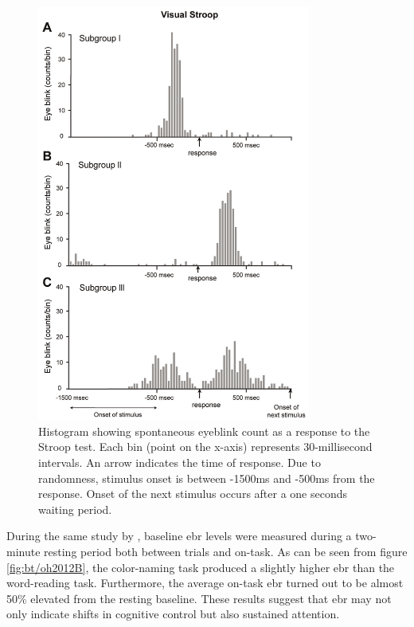 \begin{figure}[h!]
    \centering
    \includegraphics[width=0.8\textwidth]{figures/bt_oh2012A.png}
    \caption{Histogram showing spontaneous eyeblink count as a response to the Stroop test. Each bin (point on the x-axis) represents 30-millisecond intervals. An arrow indicates the time of response. Due to randomness, stimulus onset is between -1500ms and -500ms from the response. Onset of the next stimulus occurs after a one seconds waiting period.}
    \label{fig:bt/oh2012A}
\end{figure}

During the same study by \textcite{oh2012}, baseline \acrshort{ebr} levels were measured during a two-minute resting period both between trials and on-task. As can be seen from figure \ref{fig:bt/oh2012B}, the color-naming task produced a slightly higher \acrshort{ebr} than the word-reading task. Furthermore, the average on-task \acrshort{ebr} turned out to be almost 50\% elevated from the resting baseline. These results suggest that \acrshort{ebr} may not only indicate shifts in cognitive control but also sustained attention.

